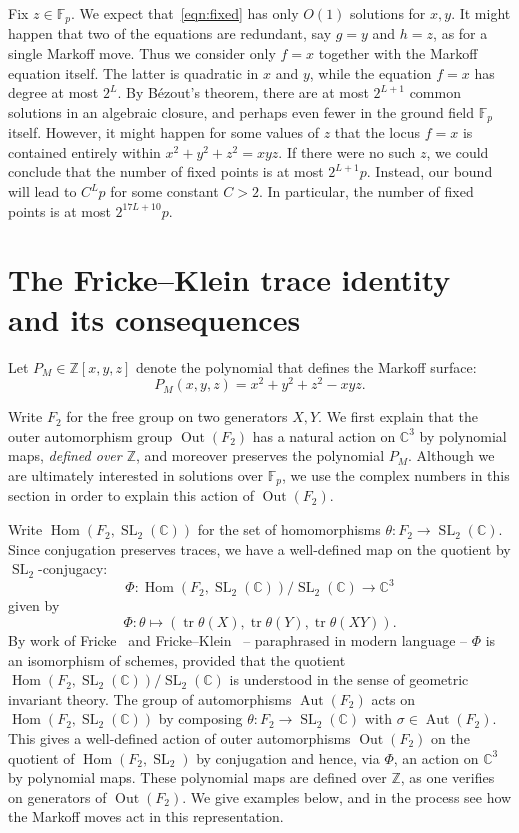 \documentclass[10pt]{amsart}
\theoremstyle{definition}\newtheorem{defi}[theo]{Definition}\newtheorem{rema}[theo]{Remark}\newtheorem{exam}[theo]{Example}\newtheorem{exem}[theo]{Example}\newtheorem{nota}[theo]{Notation}
\newcommand{\Z}{\mathbb{Z}}
\newcommand{\CC}{\mathbb{C}}
\newcommand{\F}{\mathbb{F}}
\DeclareMathOperator{\tr}{tr}
\DeclareMathOperator{\SL}{SL}
\DeclareMathOperator{\Hom}{Hom}
\DeclareMathOperator{\Aut}{Aut}
\DeclareMathOperator{\Out}{Out}
\begin{document}
Fix $z \in \F_p$. We expect that~\eqref{eqn:fixed} has only $O(1)$ solutions for $x,y$. It might happen that two of the equations are redundant, say $g=y$ and $h=z$, as for a single Markoff move. Thus we consider only $f=x$ together with the Markoff equation itself. The latter is quadratic in $x$ and $y$, while the equation $f=x$ has degree at most $2^L$. By Bézout's theorem, there are at most $2^{L+1}$ common solutions in an algebraic closure, and perhaps even fewer in the ground field $\F_p$ itself. However, it might happen for some values of $z$ that the locus $f=x$ is contained entirely within $x^2+y^2+z^2=xyz$. If there were no such $z$, we could conclude that the number of fixed points is at most $2^{L+1}p$. Instead, our bound will lead to $C^L p$ for some constant $C > 2$. In particular, the number of fixed points is at most $2^{17L+10}p$.



\section{The Fricke--Klein trace identity and its consequences} \label{sec:fricke}

Let $P_M\in \Z[x,y,z]$ denote the polynomial that defines the Markoff surface:
\[
P_M(x,y,z)= x^2 + y^2 + z^2 - xyz.
\]

Write $F_2$ for the free group on two generators $X,Y$. We first explain that the outer automorphism group $\Out(F_2)$ has a natural action on $\CC^3$ by polynomial maps, \emph{defined over $\Z$}, and moreover preserves the polynomial $P_M$. Although we are ultimately interested in solutions over $\F_p$, we use the complex numbers in this section in order to explain this action of $\Out(F_2)$.

Write $\Hom(F_2, \SL_2(\CC))$ for the set of homomorphisms $\theta : F_2 \rightarrow \SL_2(\CC)$. Since conjugation preserves traces, we have a well-defined map on the quotient by $\SL_2$-conjugacy:
\[
\Phi: \Hom(F_{2},\SL_{2}(\CC))/\SL_{2}(\CC)\to \CC^3
\]
given by
\[
\Phi : \theta \mapsto (\tr\theta(X),\tr\theta(Y),\tr\theta(XY)).
\]
By work of Fricke~\cite{FRICKE} and Fricke--Klein~\cite{FRICKEKLEIN} -- paraphrased in modern language -- $\Phi$ is an isomorphism of schemes, provided that the quotient $\Hom(F_{2},\SL_{2}(\CC))/\SL_{2}(\CC)$ is understood in the sense of geometric invariant theory. The group of automorphisms $\Aut(F_2)$ acts on $\Hom(F_2,\SL_{2}(\CC))$ by composing $\theta: F_2 \rightarrow \SL_2(\CC)$ with $\sigma \in \Aut(F_2)$. This gives a well-defined action of outer automorphisms $\Out(F_2)$ on the quotient of $\Hom(F_2,\SL_2)$ by conjugation and hence, via $\Phi$, an action on $\CC^3$ by polynomial maps. These polynomial maps are defined over $\Z$, as one verifies on generators of $\Out(F_2)$. We give examples below, and in the process see how the Markoff moves act in this representation.
\end{document}
